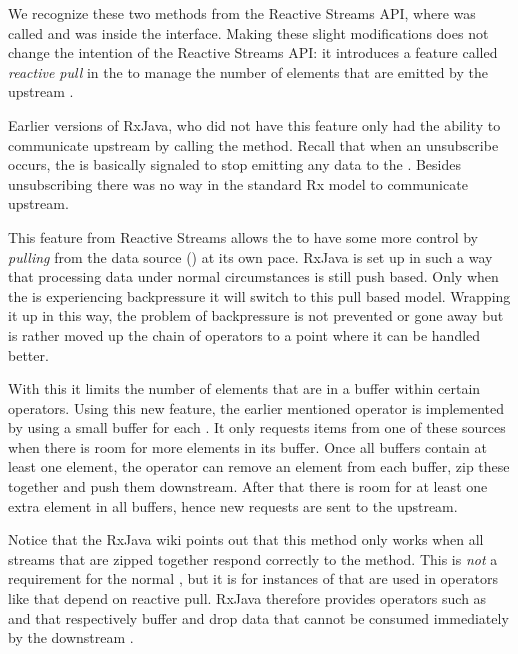 We recognize these two methods from the Reactive Streams API, where  was called  and  was inside the  interface. Making these slight modifications does not change the intention of the Reactive Streams API: it introduces a feature called \textit{reactive pull} in the \obv to manage the number of elements that are emitted by the upstream \obs.

Earlier versions of RxJava, who did not have this feature only had the ability to communicate upstream by calling the  method. Recall that when an unsubscribe occurs, the \obs is basically signaled to stop emitting any data to the \obv. Besides unsubscribing there was no way in the standard Rx model to communicate upstream.

This feature from Reactive Streams allows the \obv to have some more control by \emph{pulling} from the data source (\obs) at its own pace. RxJava is set up in such a way that processing data under normal circumstances is still push based. Only when the \obv is experiencing backpressure it will switch to this pull based model. Wrapping it up in this way, the problem of backpressure is not prevented or gone away but is rather moved up the chain of operators to a point where it can be handled better. 

With this it limits the number of elements that are in a buffer within certain operators. Using this new feature, the earlier mentioned  operator is implemented by using a small buffer for each \obs. It only requests items from one of these sources when there is room for more elements in its buffer. Once all buffers contain at least one element, the operator can remove an element from each buffer, zip these together and push them downstream. After that there is room for at least one extra element in all buffers, hence new requests are sent to the upstream.

Notice that the RxJava wiki  points out that this method only works when all streams that are zipped together respond correctly to the  method. This is \emph{not} a requirement for the normal \obs, but it is for instances of \obs that are used in operators like  that depend on reactive pull. RxJava therefore provides operators such as  and  that respectively buffer and drop data that cannot be consumed immediately by the downstream \obv.